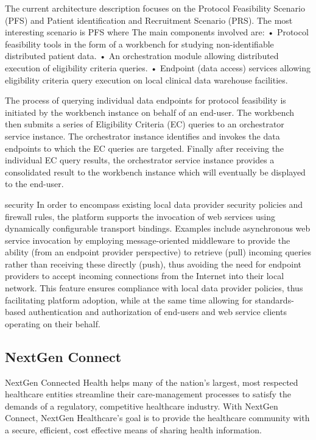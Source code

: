 The current architecture description focuses on the Protocol Feasibility Scenario (PFS) and Patient identification and Recruitment Scenario (PRS).
The most interesting scenario is PFS where The main components involved are:
• Protocol feasibility tools in the form of a workbench for studying non-identifiable distributed patient data.
• An orchestration module allowing distributed execution of eligibility criteria queries.
• Endpoint (data access) services allowing eligibility criteria query execution on local clinical data warehouse facilities.

The process of querying individual data endpoints for protocol feasibility is initiated by the workbench instance on behalf of an end-user.
The workbench then submits a series of Eligibility Criteria (EC) queries to an orchestrator service instance.
The orchestrator instance identifies and invokes the data endpoints to which the EC queries are targeted.
Finally after receiving the individual EC query results, the orchestrator service instance provides a consolidated result to the workbench instance which will eventually be displayed to the end-user.

security
In order to encompass existing local data provider security policies and firewall rules, the platform supports the invocation of web services using dynamically configurable transport bindings.
Examples include asynchronous web service invocation by employing message-oriented middleware to provide the ability (from an endpoint provider perspective) to retrieve (pull) incoming queries rather than receiving these directly (push), thus avoiding the need for endpoint providers to accept incoming connections from the Internet into their local network.
This feature ensures compliance with local data provider policies, thus facilitating platform adoption, while at the same time allowing for standards-based authentication and authorization of end-users and web service clients operating on their behalf.

\subsection*{NextGen Connect}
NextGen Connected Health helps many of the nation’s largest, most respected healthcare entities streamline their
care-management processes to satisfy the demands of a regulatory, competitive healthcare industry.
With NextGen Connect, NextGen Healthcare's goal is to provide the healthcare community with a secure, efficient, cost effective means of sharing health information.

